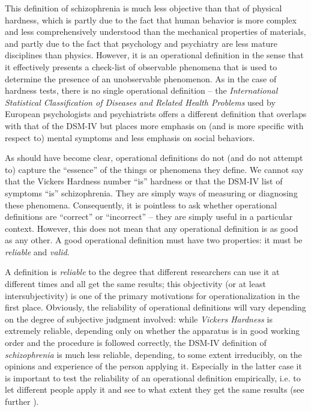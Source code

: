 This definition of schizophrenia is much less objective than that of physical hardness, which is partly due to the fact that human behavior is more complex and less comprehensively understood than the mechanical properties of materials, and partly due to the fact that psychology  and psychiatry are less mature disciplines than physics. However, it is an operational  definition in the sense that it effectively presents a check\hyp{}list of observable phenomena that is used to determine the presence of an unobservable phenomenon. As in the case of hardness tests, there is no single operational definition -- the \emph{International Statistical Classification of Diseases and Related Health Problems} used by European psychologists and psychiatrists offers a different definition that overlaps with that of the DSM\hyp{}IV but places more emphasis on (and is more specific with respect to) mental symptoms and less emphasis on social behaviors.

As should have become clear, operational definitions do not (and do not attempt to) capture the ``essence'' of the things or phenomena they define. We cannot say that the Vickers Hardness number ``is'' hardness or that the DSM\hyp{}IV list of symptoms ``is'' schizophrenia. They are simply ways of measuring  or diagnosing these phenomena. Consequently, it is pointless to ask whether operational  definitions are ``correct'' or ``incorrect'' -- they are simply useful in a particular context. However, this does not mean that any operational definition is as good as any other. A good operational definition must have two properties: it must be \emph{reliable}  and  \emph{valid}.

A definition is \emph{reliable}  to the degree that different researchers can use it at different times and all get the same results; this objectivity (or at least intersubjectivity) is one of the primary motivations for operationalization  in the first place. Obviously, the reliability of operational definitions will vary depending on the degree of subjective judgment involved: while \emph{Vickers Hardness} is extremely reliable, depending only on whether the apparatus is in good working order and the procedure is followed correctly, the DSM\hyp{}IV definition of \textit{schizophrenia} is much less reliable, depending, to some extent irreducibly, on the opinions and experience of the person applying it. Especially in the latter case it is important to test the reliability  of an operational  definition empirically, i.e. to let different people apply it and see to what extent they get the same results (see further ).


